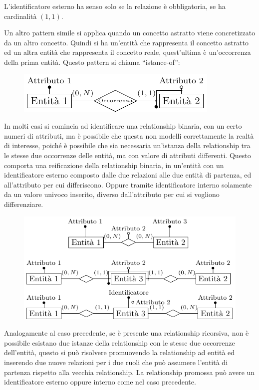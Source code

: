 \documentclass{article}
\numberwithin{equation}{subsection}
\begin{document}
L'identificatore esterno ha senso solo se la relazione è obbligatoria, se ha cardinalità $(1,1)$. 


Un altro pattern simile si applica quando un concetto astratto viene concretizzato da un altro concetto. Quindi si ha un'entità che rappresenta il concetto astratto ed un altra entità che 
rappresenta il concetto reale, quest'ultima è un'occorrenza della prima entità. Questo pattern si chiama ``istance-of'':
\begin{figure}[H]%
    \centering%
    \includegraphics[scale=1.25]{istance_of.pdf}%
\end{figure}

In molti casi si comincia ad identificare una relationship binaria, con un certo numeri di attributi, ma è possibile che questa non modelli correttamente la realtà di interesse, poiché è possibile 
che sia necessaria un'istanza della relationship tra le stesse due occorrenze delle entità, ma con valore di attributi differenti. Questo comporta una reificazione della relationship binaria, 
in un'entità con un identificatore esterno composto dalle due relazioni alle due entità di partenza, ed all'attributo per cui differiscono. Oppure tramite identificatore interno solamente da un 
valore univoco inserito, diverso dall'attributo per cui si vogliono differenziare. 

\begin{figure}[H]%
    \centering%
    \includegraphics[scale=1.25]{reificazione_relationship.pdf}%
\end{figure}


Analogamente al caso precedente, se è presente una relationship ricorsiva, non è possibile esistano due istanze della relationship con le stesse due occorrenze dell'entità, questo si può 
risolvere promuovendo la relationship ad entità ed inserendo due nuove relazioni per i due ruoli che può assumere l'entità di partenza rispetto alla vecchia relationship. La relationship 
promossa può avere un identificatore esterno oppure interno come nel caso precedente. 
\end{document}
